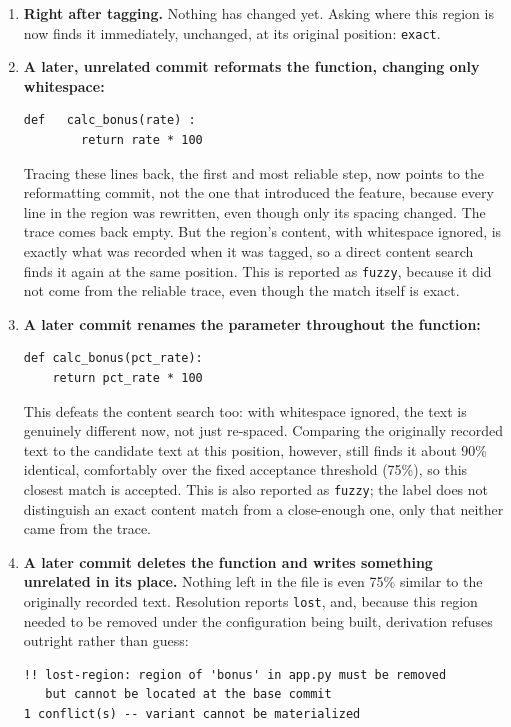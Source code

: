 \documentclass[11pt]{article}
\begin{document}
\begin{enumerate}[leftmargin=1.6em]
  \item \textbf{Right after tagging.} Nothing has changed yet. Asking
    where this region is now finds it immediately, unchanged, at its
    original position: \texttt{exact}.
  \item \textbf{A later, unrelated commit reformats the function,
    changing only whitespace:}
\begin{verbatim}
def   calc_bonus(rate) :
        return rate * 100
\end{verbatim}
    Tracing these lines back, the first and most reliable step, now points to the reformatting
    commit, not the one that introduced the feature, because every line
    in the region was rewritten, even though only its spacing changed.
    The trace comes back empty. But the region's content, with whitespace
    ignored, is exactly what was recorded when it was tagged, so a direct
    content search finds it again at the same position. This is reported
    as \texttt{fuzzy}, because it did not come from the reliable trace,
    even though the match itself is exact.
  \item \textbf{A later commit renames the parameter throughout the
    function:}
\begin{verbatim}
def calc_bonus(pct_rate):
    return pct_rate * 100
\end{verbatim}
    This defeats the content search too: with whitespace ignored, the
    text is genuinely different now, not just re-spaced. Comparing the
    originally recorded text to the candidate text at this position,
    however, still finds it about 90\% identical, comfortably over the
    fixed acceptance threshold (75\%), so this closest match is accepted.
    This is also reported as \texttt{fuzzy}; the label does not
    distinguish an exact content match from a close-enough one, only that
    neither came from the trace.
  \item \textbf{A later commit deletes the function and writes something
    unrelated in its place.} Nothing left in the file is even 75\%
    similar to the originally recorded text. Resolution reports
    \texttt{lost}, and, because this region needed to be removed under
    the configuration being built, derivation refuses outright rather
    than guess:
\begin{verbatim}
!! lost-region: region of 'bonus' in app.py must be removed
   but cannot be located at the base commit
1 conflict(s) -- variant cannot be materialized
\end{verbatim}
\end{enumerate}
\end{document}
